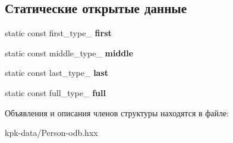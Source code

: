 \subsection*{Статические открытые данные}
\begin{DoxyCompactItemize}
\item 
static const first\+\_\+type\+\_\+ {\bfseries first}\hypertarget{structodb_1_1pointer__query__columns_3_01_1_1kpk_1_1data_1_1_person_00_01id__pgsql_00_01_a_01_4_1_1name__class___a17258de39d0214aee865da829f9c6575}{}\label{structodb_1_1pointer__query__columns_3_01_1_1kpk_1_1data_1_1_person_00_01id__pgsql_00_01_a_01_4_1_1name__class___a17258de39d0214aee865da829f9c6575}

\item 
static const middle\+\_\+type\+\_\+ {\bfseries middle}\hypertarget{structodb_1_1pointer__query__columns_3_01_1_1kpk_1_1data_1_1_person_00_01id__pgsql_00_01_a_01_4_1_1name__class___af292ea76ca2f2833b5a07648217d1dfd}{}\label{structodb_1_1pointer__query__columns_3_01_1_1kpk_1_1data_1_1_person_00_01id__pgsql_00_01_a_01_4_1_1name__class___af292ea76ca2f2833b5a07648217d1dfd}

\item 
static const last\+\_\+type\+\_\+ {\bfseries last}\hypertarget{structodb_1_1pointer__query__columns_3_01_1_1kpk_1_1data_1_1_person_00_01id__pgsql_00_01_a_01_4_1_1name__class___a296a79b921077c6fb1c501e627342f93}{}\label{structodb_1_1pointer__query__columns_3_01_1_1kpk_1_1data_1_1_person_00_01id__pgsql_00_01_a_01_4_1_1name__class___a296a79b921077c6fb1c501e627342f93}

\item 
static const full\+\_\+type\+\_\+ {\bfseries full}\hypertarget{structodb_1_1pointer__query__columns_3_01_1_1kpk_1_1data_1_1_person_00_01id__pgsql_00_01_a_01_4_1_1name__class___a0bbd0524f4286ab1faab466bf9f13bd2}{}\label{structodb_1_1pointer__query__columns_3_01_1_1kpk_1_1data_1_1_person_00_01id__pgsql_00_01_a_01_4_1_1name__class___a0bbd0524f4286ab1faab466bf9f13bd2}

\end{DoxyCompactItemize}


Объявления и описания членов структуры находятся в файле\+:\begin{DoxyCompactItemize}
\item 
kpk-\/data/Person-\/odb.\+hxx\end{DoxyCompactItemize}
